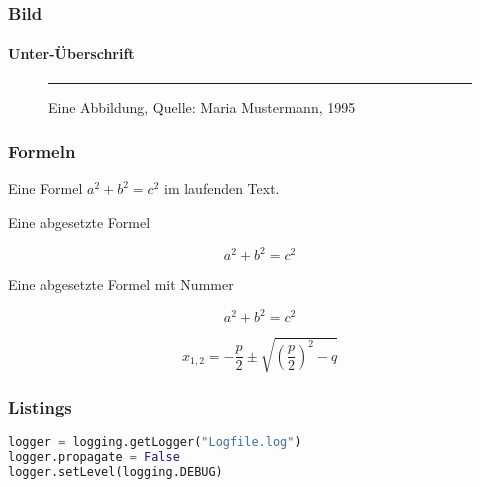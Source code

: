 \documentclass[12pt,ngerman]{beamer}
\begin{document}
\begin{frame}
\frametitle{Bild}
\framesubtitle{Unter-Überschrift}

\begin{center}
\begin{figure}
\rule{\textwidth}{0.5\textwidth}
\caption{Eine Abbildung, Quelle: Maria Mustermann, 1995}
\end{figure}
\end{center}


\end{frame}


\begin{frame}
\frametitle{Formeln}

Eine Formel \(a^2+b^2=c^2\) im laufenden Text.

Eine abgesetzte Formel 

\[a^2+b^2=c^2\]

Eine abgesetzte Formel mit Nummer

\begin{equation}
a^2+b^2=c^2
\end{equation}


\begin{equation}
x_{1, 2} = -\frac{p}{2} \pm \sqrt{ \left(\frac{p}{2}\right)^2 -q }
\end{equation}

\end{frame}

\begin{frame}[containsverbatim] %
\frametitle{Listings}

\begin{lstlisting}[language={Python},caption={Python Code},morekeywords={getLogger, propagate, setLevel}]
logger = logging.getLogger("Logfile.log")
logger.propagate = False
logger.setLevel(logging.DEBUG)
\end{lstlisting}
\end{frame}
\end{document}
